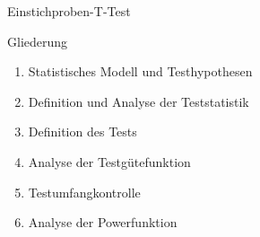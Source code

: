 \documentclass[
  8pt,
  ignorenonframetext,
]{beamer}
\providecommand{\tightlist}{%
  \setlength{\itemsep}{0pt}\setlength{\parskip}{0pt}}
\begin{document}
\begin{frame}{Einstichproben-T-Test}
\protect\hypertarget{einstichproben-t-test-4}{}
\large

Gliederung

\normalsize

\begin{enumerate}
[(1)]
\tightlist
\item
  Statistisches Modell und Testhypothesen
\item
  Definition und Analyse der Teststatistik
\item
  Definition des Tests
\item
  Analyse der Testgütefunktion
\item
  Testumfangkontrolle
\item
  Analyse der Powerfunktion
\end{enumerate}
\end{frame}
\end{document}
